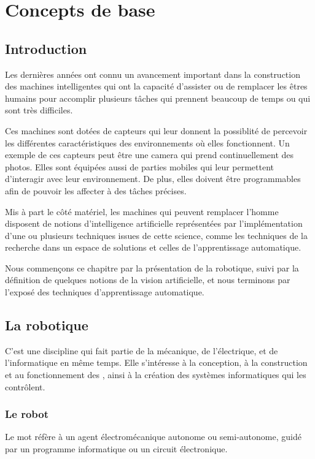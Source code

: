 \chapter{Concepts de base}

\section{Introduction}

Les dernières années ont connu un avancement important dans la construction des
machines intelligentes qui ont la capacité d'assister ou de remplacer les
êtres humains pour accomplir plusieurs tâches qui prennent beaucoup de temps ou
qui sont très difficiles.

Ces machines sont dotées de capteurs qui leur donnent la possiblité de percevoir
les différentes caractéristiques des environnements où elles fonctionnent. Un
exemple de ces capteurs peut être une camera qui prend continuellement des photos.
Elles sont équipées aussi de parties mobiles qui leur permettent
d'interagir avec leur environnement. De plus, elles doivent
être programmables afin de pouvoir les affecter à des tâches précises.

Mis à part le côté matériel, les machines qui peuvent remplacer l'homme disposent
de notions d'intelligence artificielle représentées par l'implémentation d'une ou
plusieurs techniques issues de cette science, comme les techniques de la
recherche dans un espace de solutions et celles de l'apprentissage automatique.

Nous commençons ce chapitre par la présentation de la robotique, suivi par
la définition de quelques notions de la vision artificielle, et nous terminons
par l'exposé des techniques d'apprentissage automatique.

\section{La robotique}

C'est une discipline qui fait partie de la mécanique, de l'électrique, et de
l'informatique en même temps. Elle s'intéresse à la conception, à la
construction et au fonctionnement des , ainsi à la création
des systèmes informatiques qui les contrôlent.

\subsection{Le robot}

Le mot  réfère à un agent électromécanique autonome ou
semi-autonome, guidé par un programme informatique ou un circuit électronique.

